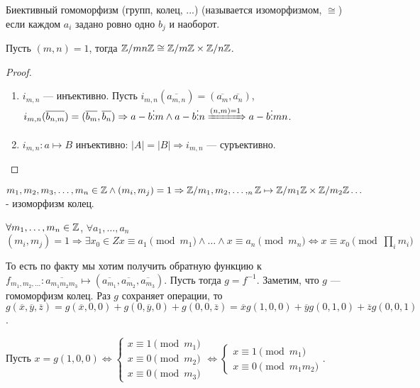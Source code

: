 \begin{definition}
    Биективный гомоморфизм (групп, колец, ...) (называется изоморфизмом, $\cong$) если каждом $a_i$ задано ровно одно  $b_j$ и наоборот.
\end{definition}
\begin{theorem}
    Пусть $(m, n)=1$, тогда $\mathbb{Z} / mn \mathbb{Z} \cong \mathbb{Z} / m\mathbb{Z} \times \mathbb{Z} / n \mathbb{Z}$.
\end{theorem}
\begin{proof}
    \slashn
    \begin{enumerate}
        \item $i_{m,n}$ --- инъективно. Пусть $i_{m,n}(\overline{a_{m,n}}) = (\overline{a_m}, \overline{a_n})$,  $i_{m,n}(\overline{b_{n, m}}) = (\overline{b_m}, \overline{b_n}) \Rightarrow  a-b \vdots m \land a-b\vdots n \xRightarrow{(n, m) = 1} a - b \vdots mn$.
        \item $i_{m, n}: a \mapsto B$ инъективно: $|A| = |B| \Rightarrow i_{m, n}$ --- суръективно.  
    \end{enumerate}
\end{proof}
\begin{theorem}[КТО 2]
    $m_1,m_2,m_3,\ldots,m_n \in \mathbb{Z} \land (m_i, m_j) = 1 \Rightarrow \mathbb{Z} / m_1,m_2,\ldots,_n \mathbb{Z} \mapsto \mathbb{Z} / m_1\mathbb{Z} \times \mathbb{Z} / m_2\mathbb{Z} \ldots$ - изоморфизм колец. 
\end{theorem}
\begin{theorem}
    $\forall m_1, \ldots, m_n \in \mathbb{Z}$, $\forall a_1, \ldots, a_n$ $(m_i, m_j) = 1 \Rightarrow \exists x_0 \in Z x \equiv a_1 \pmod{m_1} \land \ldots \land x \equiv a_n \pmod{m_n} \iff x \equiv x_0 \pmod {\prod_i m_i}$
\end{theorem}
\slashn
То есть по факту мы хотим получить обратную функцию к $f_{m_1,m_2,\ldots}: \overline{a_{m_1m_2m_3}} \mapsto (\overline{a_{m_1}}, \overline{a_{m_2}}, \overline{a_{m_3}})$. Пусть тогда $g=f^{-1}$. Заметим, что  $g$ --- гомоморфизм колец. Раз  $g$ сохраняет операции, то  $g(\overline{x}, \overline{y}, \overline{z}) = g(\overline{x}, 0, 0) + g(0, \overline{y}, 0) + g(0, 0, \overline{z}) = \overline{x}g(1, 0, 0) + \overline{y}g(0, 1, 0) + \overline{z}g(0, 0, 1)$.

Пусть  $x=g(1, 0, 0) \iff \begin{cases} x \equiv 1 \pmod{m_1} \\ x \equiv 0 \pmod{m_2} \\ x \equiv 0 \pmod{m_3} \end{cases} \iff \begin{cases} x \equiv 1 \pmod{m_1} \\ x \equiv 0 \pmod{m_1m_2} \end{cases}$.

